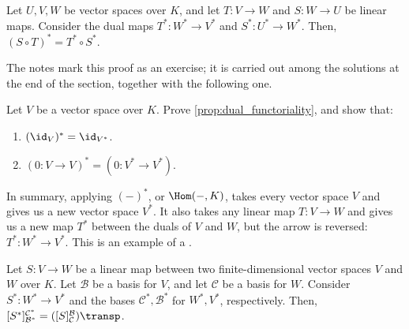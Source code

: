\begin{proposition}
  \label{prop:dual_functoriality}
  Let $U, V, W$ be vector spaces over $K$, and let $T \colon V \to W$ and $S \colon W \to U$ be linear maps. Consider the dual maps $T^* \colon W^* \to V^*$ and $S^* \colon U^* \to W^*$. Then, $(S \circ T)^* = T^* \circ S^*$.
\end{proposition}

The notes mark this proof as an exercise; it is carried out among the solutions at the end of the section, together with the following one.

\begin{exercise}
  \label{exc:dual_functoriality}
  Let $V$ be a vector space over $K$. Prove \cref{prop:dual_functoriality}, and show that:
  \begin{enumerate}[label=\textbf{(\alph*)}]
    \item $(\id_V)^* = \id_{V^*}$.
    \item $(0 \colon V \to V)^* = (0 \colon V^* \to V^*)$.
  \end{enumerate}
\end{exercise}


\begin{summary}
In summary, applying $(-)^*$, or $\Hom(-,K)$, takes every vector space $V$ and gives us a new vector space $V^*$. It also takes any linear map $T \colon V \to W$ and gives us a new map $T^*$ between the duals of $V$ and $W$, but the arrow is reversed: $T^* \colon W^* \to V^*$. This is an example of a .
\end{summary}

\begin{lemma}
  \label{lem:dual_map_transpose}
  Let $S \colon V \to W$ be a linear map between two finite-di\-men\-sional vector spaces $V$ and $W$ over $K$. Let $\mathcal{B}$ be a basis for $V$, and let $\mathcal{C}$ be a basis for $W$. Consider $S^* \colon W^* \to V^*$ and the bases $\mathcal{C}^*, \mathcal{B}^*$ for $W^*, V^*$, respectively. Then, $[S^*]_{\mathcal{B}^*}^{\mathcal{C}^*} = ([S]_{\mathcal{C}}^{\mathcal{B}})\transp$.
\end{lemma}

